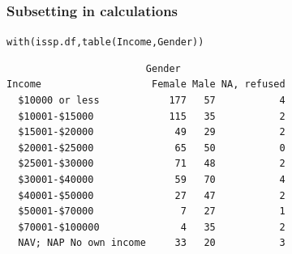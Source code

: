 \documentclass{beamer}\usepackage[]{graphicx}\usepackage[]{color}
\makeatletter
\newcommand{\hlstd}[1]{\textcolor[rgb]{0,0,0}{#1}}%
\newcommand{\hlkwd}[1]{\textcolor[rgb]{0,0.267,0.4}{#1}}%
\newenvironment{kframe}{%
 \def\at@end@of@kframe{}%
 \ifinner\ifhmode%
  \def\at@end@of@kframe{\end{minipage}}%
  \begin{minipage}{\columnwidth}%
 \fi\fi%
 \def\FrameCommand##1{\hskip\@totalleftmargin \hskip-\fboxsep
 \colorbox{shadecolor}{##1}\hskip-\fboxsep
     \hskip-\linewidth \hskip-\@totalleftmargin \hskip\columnwidth}%
 \MakeFramed {\advance\hsize-\width
   \@totalleftmargin\z@ \linewidth\hsize
   \@setminipage}}%
 {\par\unskip\endMakeFramed%
 \at@end@of@kframe}
\newenvironment{knitrout}{}{} %
\makeatother
\begin{document}
\begin{frame}[fragile]
\frametitle{Subsetting in calculations} 
\begin{knitrout}
\color{fgcolor}\begin{kframe}
\begin{alltt}
\hlkwd{with}\hlstd{(issp.df,} \hlkwd{table}\hlstd{(Income, Gender))}
\end{alltt}
\begin{verbatim}
                        Gender
Income                   Female Male NA, refused
  $10000 or less            177   57           4
  $10001-$15000             115   35           2
  $15001-$20000              49   29           2
  $20001-$25000              65   50           0
  $25001-$30000              71   48           2
  $30001-$40000              59   70           4
  $40001-$50000              27   47           2
  $50001-$70000               7   27           1
  $70001-$100000              4   35           2
  NAV; NAP No own income     33   20           3
\end{verbatim}
\end{kframe}
\end{knitrout}
\end{frame}
\end{document}
